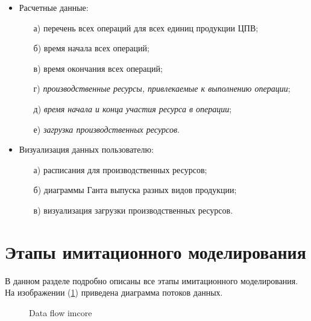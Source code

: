 \begin{itemize}
	\item Расчетные данные:	
		\begin{itemize}
			\item[а)] перечень всех операций для всех единиц продукции ЦПВ;
			\item[б)] время начала всех операций;
			\item[в)] время окончания всех операций;
			\item[г)] \textit{производственные ресурсы, привлекаемые к выполнению операции};
			\item[д)] \textit{время начала и конца участия ресурса в операции};
			\item[е)] \textit{загрузка производственных ресурсов}.
		\end{itemize}		
	\item Визуализация данных пользователю:
		\begin{itemize}
			\item[а)] расписания для производственных ресурсов;
			\item[б)] диаграммы Ганта выпуска разных видов продукции;
			\item[в)] визуализация загрузки производственных ресурсов.
		\end{itemize}		 
\end{itemize}

\section{Этапы имитационного моделирования}
В данном разделе подробно описаны все этапы имитационного моделирования.
На изображении (\ref{ris:DataFlow}) приведена диаграмма потоков данных.

\begin{figure}[H]
    \caption{Data flow imcore}
    \label{ris:DataFlow}
\end{figure}

